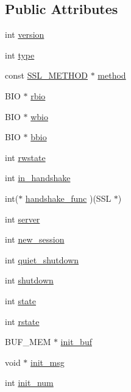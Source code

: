 \subsection*{Public Attributes}
\begin{DoxyCompactItemize}
\item 
int \hyperlink{structssl__st_a104b2a57e68e7e8c228c34d9ffb0e3dd}{version}
\item 
int \hyperlink{structssl__st_a5d2a229f22c169bd5eecefd9f017e089}{type}
\item 
const \hyperlink{ssl_8h_a74d54b9a714accac31c73bfb55973e81}{S\-S\-L\-\_\-\-M\-E\-T\-H\-O\-D} $\ast$ \hyperlink{structssl__st_a10dff58d99726fe56b47ec037c54802e}{method}
\item 
B\-I\-O $\ast$ \hyperlink{structssl__st_abd180ca9a0f2fb959b07600dcca58118}{rbio}
\item 
B\-I\-O $\ast$ \hyperlink{structssl__st_a81a174cdc5f516202537ff6fef6680ed}{wbio}
\item 
B\-I\-O $\ast$ \hyperlink{structssl__st_ab0e7dbfa9d11fab6879da0ad8625b65b}{bbio}
\item 
int \hyperlink{structssl__st_a10e8e706cff52214bc873c05786a80ce}{rwstate}
\item 
int \hyperlink{structssl__st_afc46f99873655d3532930b3f0abb3f98}{in\-\_\-handshake}
\item 
int($\ast$ \hyperlink{structssl__st_a1360a67ff9b94ed9a07da04928cdd661}{handshake\-\_\-func} )(S\-S\-L $\ast$)
\item 
int \hyperlink{structssl__st_a022f1e4cf3a0a68ffc4f4d80d4de8d6b}{server}
\item 
int \hyperlink{structssl__st_a5e265a8751b5a1641b71efda933a6b61}{new\-\_\-session}
\item 
int \hyperlink{structssl__st_a3e921ca488cd9eec6ad4065ef627395a}{quiet\-\_\-shutdown}
\item 
int \hyperlink{structssl__st_a12a82cfd124852a54354a46012bdd502}{shutdown}
\item 
int \hyperlink{structssl__st_acf88d642e936bdeb73777730b63f70f6}{state}
\item 
int \hyperlink{structssl__st_a30d0255e120ff83b3c35ab05cd3dae64}{rstate}
\item 
B\-U\-F\-\_\-\-M\-E\-M $\ast$ \hyperlink{structssl__st_ae79d4878386098526f000f857b38854f}{init\-\_\-buf}
\item 
void $\ast$ \hyperlink{structssl__st_a0d932f5ec1630a3cbd511548c3556a45}{init\-\_\-msg}
\item 
int \hyperlink{structssl__st_a5bdef1be2cab43e264edd98f162f7fff}{init\-\_\-num}

\end{DoxyCompactItemize}
